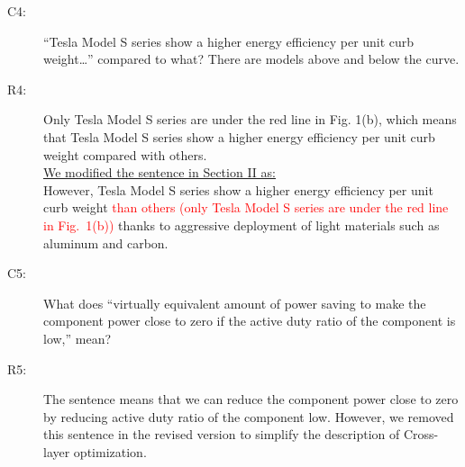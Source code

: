 \documentclass[onecolumn]{IEEEconf}
\begin{document}
\begin{description}
\item [C4: ]  “Tesla Model S series show a higher energy efficiency per unit curb weight…” compared to what? There are models above and below the curve.
\item [R4: ] Only Tesla Model S series are under the red line in Fig. 1(b), which means that Tesla Model S series show a higher energy efficiency per unit curb weight compared with others. \\

\underline{We modified the sentence in Section II as:}\\
However, Tesla Model S series show a higher energy efficiency per unit curb weight \textcolor{red}{than others (only Tesla Model S series are under the red line in Fig.~1(b))} thanks to aggressive deployment of light materials such as aluminum and carbon.
~\\

\item [C5: ] What does “virtually equivalent amount of power saving to make the component power close to zero if the active duty ratio of the component is low,” mean?
\item [R5: ] The sentence means that we can reduce the component power close to zero by reducing active duty ratio of the component low. However, we removed this sentence in the revised version to simplify the description of Cross-layer optimization.\\
~\\

\end{description}
\end{document}
